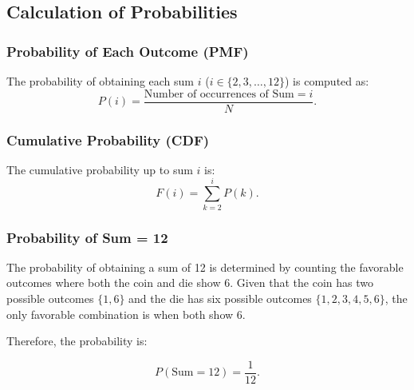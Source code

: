 \documentclass[journal]{IEEEtran}
\begin{document}
\subsection*{Calculation of Probabilities}
\subsubsection*{Probability of Each Outcome (PMF)}
The probability of obtaining each sum $i$ (\( i \in \{2, 3, \ldots, 12\} \)) is computed as:
\[
P(i) = \frac{\text{Number of occurrences of Sum} = i}{N}.
\]

\subsubsection*{Cumulative Probability (CDF)}
The cumulative probability up to sum $i$ is:
\[
F(i) = \sum_{k=2}^{i} P(k).
\]

\subsubsection*{Probability of Sum = 12}
The probability of obtaining a sum of 12 is determined by counting the favorable outcomes where both the coin and die show 6. Given that the coin has two possible outcomes \( \{1, 6\} \) and the die has six possible outcomes \( \{1, 2, 3, 4, 5, 6\} \), the only favorable combination is when both show 6.

Therefore, the probability is:

\[
P(\text{Sum} = 12) = \frac{1}{12}.
\]
\end{document}
